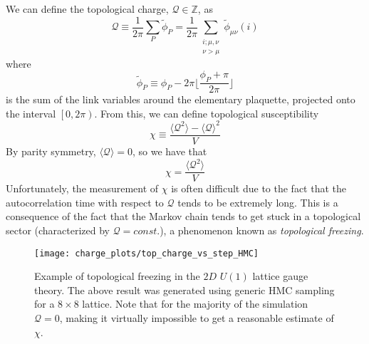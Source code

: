 We can define the topological charge, $\mathcal{Q} \in \mathbb{Z}$, as
%
\begin{equation}
  \mathcal{Q} \equiv \frac{1}{2\pi}\sum_{P} \tilde \phi_{P} =
    \frac{1}{2\pi}\sum_{\substack{{i; \mu, \nu}\\{\nu > \mu}}}
    \tilde \phi_{\mu\nu}{(i)}
    \label{eq:topological_charge}
\end{equation}
%
where
%
\begin{equation}
  \tilde{\phi}_{P} \equiv \phi_{P} - 2\pi {\bigg\lfloor{\frac{\phi_{P} +
  \pi}{2\pi}\bigg\rfloor}}
\end{equation}
%
is the sum of the link variables around the elementary plaquette, projected
onto the interval $\left[0, 2 \pi\right)$.
%
From this, we can define topological susceptibility
%
\begin{equation}
    \chi \equiv \frac{\langle \mathcal{Q}^2\rangle - \langle \mathcal{Q} \rangle^2}{V}
\end{equation}
%
By parity symmetry, $\langle \mathcal{Q} \rangle = 0$, so we have that
\begin{equation}
    \chi = \frac{\langle \mathcal{Q}^2\rangle}{V}
    \label{eq:topological_susceptibility}
\end{equation}
%
Unfortunately, the measurement of $\chi$ is often difficult due to the fact
that the autocorrelation time with respect to $\mathcal{Q}$ tends to be extremely long.
%
This is a consequence of the fact that the Markov chain tends to get stuck in a
topological sector (characterized by $\mathcal{Q} = const$.), a phenomenon known as
\emph{topological freezing}.
%
\begin{figure}[htpb]
  \centering
    \texttt{[image: charge\_plots/top\_charge\_vs\_step\_HMC]}
    \caption{Example of topological freezing in the $2D$ $U{(1)}$
      lattice gauge theory. The above result was generated using generic HMC
      sampling for a $8\times8$ lattice. Note that for the majority of the
      simulation $\mathcal{Q}=0$, making it virtually impossible to get a reasonable
    estimate of $\chi$.}\label{fig:top_charge} 
  \end{figure}
%
%
